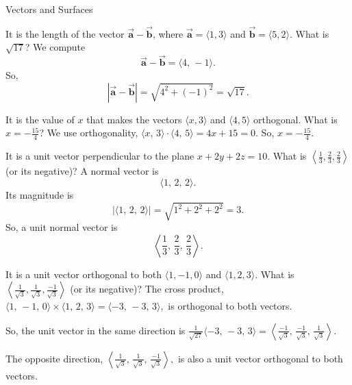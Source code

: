 \documentclass{article}
\newcommand{\bvec}[1]{\vec{\mathbf{#1}}}
\newcommand{\dotprod}{\cdot}
\begin{document}
\begin{category}{Vectors and Surfaces}

  \begin{clue}[say]
    It is the length of the vector $\bvec{a}-\bvec{b}$, where $\bvec{a} = \langle1,3\rangle$ and $\bvec{b} = \langle5,2\rangle$.
  \response
    What is $\sqrt{17}$?
  \solution
    We compute
    \[
    \bvec{a}-\bvec{b}=\langle 4,\,-1\rangle.
    \]
    So,
    \[
    \left|\bvec{a}-\bvec{b}\right|=\sqrt{4^2+(-1)^2}=\sqrt{17}.
    \]
  \end{clue}

  \begin{clue}[say]
    It is the value of $x$ that makes the vectors $\langle x,3\rangle$ and $\langle4,5\rangle$ orthogonal.
  \response
    What is $x=-\frac{15}{4}$?
  \solution
    We use orthogonality,
    $\langle x,\,3\rangle \dotprod \langle 4,\,5\rangle = 4x+15=0.$ So, $x=-\frac{15}{4}$.
  \end{clue}

  \begin{clue}[write]
    It is a unit vector perpendicular to the plane $x+2y+2z=10$.
  \response
    What is $\left\langle \frac{1}{3}, \frac{2}{3}, \frac{2}{3}\right\rangle$ (or its negative)?
  \solution
    A normal vector is
    \[
    \langle 1,\,2,\,2\rangle.
    \]
    Its magnitude is
    \[
    \left|\langle 1,\,2,\,2\rangle\right|=\sqrt{1^2+2^2+2^2}=3.
    \]
    So, a unit normal vector is
    \[
    \left\langle \frac{1}{3},\,\frac{2}{3},\,\frac{2}{3}\right\rangle.
    \]
  \end{clue}

  \begin{clue}[write]
    It is a unit vector orthogonal to both $\langle1, -1, 0\rangle$ and $\langle1,2,3\rangle$.
  \response
    What is $\left\langle \frac{1}{\sqrt{3}}, \frac{1}{\sqrt{3}}, \frac{-1}{\sqrt{3}}\right\rangle$ (or its negative)?
  \solution
    The cross product, $\langle 1,\,-1,\,0\rangle\times\langle 1,\,2,\,3\rangle=\langle -3,\,-3,\,3\rangle,$ is orthogonal to both vectors.

    So, the unit vector in the same direction is
    $\frac{1}{\sqrt{27}}\langle -3,\,-3,\,3\rangle=
    \left\langle \frac{-1}{\sqrt{3}},\,\frac{-1}{\sqrt{3}},\,\frac{1}{\sqrt{3}}\right\rangle.$

    The opposite direction,
    $\left\langle \frac{1}{\sqrt{3}},\,\frac{1}{\sqrt{3}},\,\frac{-1}{\sqrt{3}}\right\rangle,$ is also a unit vector orthogonal to both vectors.
  \end{clue}


\end{category}
\end{document}
